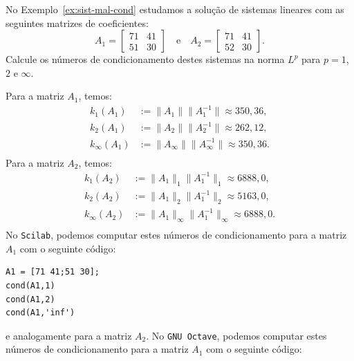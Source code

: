 \begin{ex}
  No Exemplo~\ref{ex:sist-mal-cond} estudamos a solução de sistemas lineares com as seguintes matrizes de coeficientes:
  \begin{equation}
    A_1 =
    \begin{bmatrix}
      71 & 41\\
      51 & 30
    \end{bmatrix}\quad\text{e}\quad
    A_2 =
    \begin{bmatrix}
      71 & 41\\
      52 & 30
    \end{bmatrix}.
  \end{equation}
Calcule os números de condicionamento destes sistemas na norma $L^p$ para $p=1$, $2$ e $\infty$.
\end{ex}
\begin{sol}
  Para a matriz $A_1$, temos:
  \begin{equation}
    \begin{split}
      k_1(A_1) &:= \|A_1\|\|A_1^{-1}\| \approx 350,36,\\
      k_2(A_1) &:= \|A_2\|\|A_2^{-1}\| \approx 262,12,\\
      k_\infty(A_1) &:= \|A_\infty\|\|A_\infty^{-1}\| \approx 350,36.\\
    \end{split}
  \end{equation}
  Para a matriz $A_2$, temos:
  \begin{equation}
    \begin{split}
      k_1(A_2) &:= \|A_1\|_1\|A_1^{-1}\|_1 \approx 6888,0,\\
      k_2(A_2) &:= \|A_1\|_2\|A_1^{-1}\|_2 \approx 5163,0,\\
      k_\infty(A_2) &:= \|A_1\|_\infty\|A_1^{-1}\|_\infty \approx 6888,0.\\
    \end{split}
  \end{equation}
\ifisscilab
No \verb+Scilab+, podemos computar estes números de condicionamento para a matriz $A_1$ com o seguinte código:
\begin{verbatim}
A1 = [71 41;51 30];
cond(A1,1)
cond(A1,2)
cond(A1,'inf')
\end{verbatim}
e analogamente para a matriz $A_2$.
\fi
\ifisoctave
No \verb+GNU Octave+, podemos computar estes números de condicionamento para a matriz $A_1$ com o seguinte código:

\end{sol}
